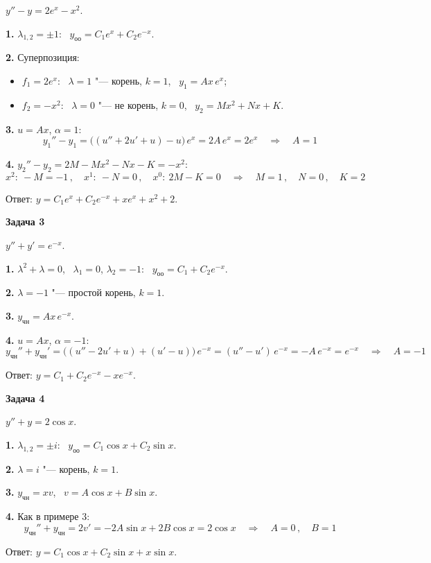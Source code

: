 \documentclass[11pt,a4paper]{article}
\newcommand{\example}[1]{\par\medskip\noindent\textbf{#1}\par\nopagebreak\smallskip}
\newcommand{\yoo}{y_{\text{оо}}}
\newcommand{\ych}{y_{\text{чн}}}
\begin{document}
$y'' - y = 2e^{x} - x^2$.

\textbf{1.} $\lambda_{1,2} = \pm 1$: \ $\yoo = C_1 e^{x} + C_2 e^{-x}$.

\textbf{2.} Суперпозиция:
\begin{itemize}
  \item $f_1 = 2e^{x}$: \ $\lambda = 1$ "--- корень, $k = 1$, \ $y_1 = Ax\, e^{x}$;
  \item $f_2 = -x^2$: \ $\lambda = 0$ "--- не корень, $k = 0$, \ $y_2 = Mx^2 + Nx + K$.
\end{itemize}

\textbf{3.} $u = Ax$, $\alpha = 1$:
\[
  y_1'' - y_1 = \bigl((u'' + 2u' + u) - u\bigr)\, e^{x} = 2A\, e^{x} = 2e^{x}
  \quad\Rightarrow\quad A = 1
\]

\textbf{4.} $y_2'' - y_2 = 2M - Mx^2 - Nx - K = -x^2$:
\[
  x^2:\ -M = -1\,, \quad x^1:\ -N = 0\,, \quad x^0:\ 2M - K = 0
  \quad\Rightarrow\quad
  M = 1\,, \quad N = 0\,, \quad K = 2
\]

Ответ: $y = C_1 e^{x} + C_2 e^{-x} + x e^{x} + x^2 + 2$.

\example{Задача 3}

$y'' + y' = e^{-x}$.

\textbf{1.} $\lambda^2 + \lambda = 0$, \ $\lambda_1 = 0$, $\lambda_2 = -1$: \ $\yoo = C_1 + C_2 e^{-x}$.

\textbf{2.} $\lambda = -1$ "--- простой корень, $k = 1$.

\textbf{3.} $\ych = Ax\, e^{-x}$.

\textbf{4.} $u = Ax$, $\alpha = -1$:
\[
  \ych'' + \ych' = \bigl((u'' - 2u' + u) + (u' - u)\bigr)\, e^{-x} = (u'' - u')\, e^{-x} = -A\, e^{-x} = e^{-x}
  \quad\Rightarrow\quad A = -1
\]

Ответ: $y = C_1 + C_2 e^{-x} - x e^{-x}$.

\example{Задача 4}

$y'' + y = 2\cos x$.

\textbf{1.} $\lambda_{1,2} = \pm i$: \ $\yoo = C_1\cos x + C_2\sin x$.

\textbf{2.} $\lambda = i$ "--- корень, $k = 1$.

\textbf{3.} $\ych = x v$, \ $v = A\cos x + B\sin x$.

\textbf{4.} Как в примере 3:
\[
  \ych'' + \ych = 2v' = -2A\sin x + 2B\cos x = 2\cos x
  \quad\Rightarrow\quad A = 0\,, \quad B = 1
\]

Ответ: $y = C_1\cos x + C_2\sin x + x\sin x$.


\newpage
\end{document}
